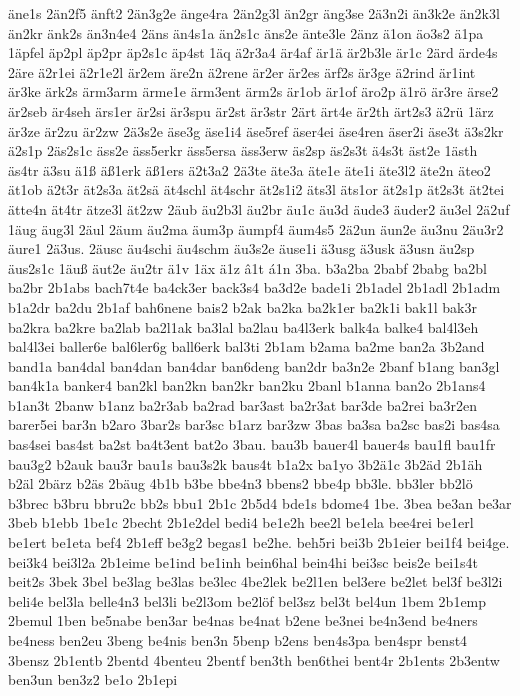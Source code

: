 {äne1s
2än2f5
änft2
2än3g2e
änge4ra
2än2g3l
än2gr
äng3se
2ä3n2i
än3k2e
än2k3l
än2kr
änk2s
än3n4e4
2äns
än4s1a
än2s1c
äns2e
änte3le
2änz
ä1on
äo3s2
ä1pa
1äpfel
äp2pl
äp2pr
äp2s1c
äp4st
1äq
ä2r3a4
är4af
är1ä
är2b3le
är1c
2ärd
ärde4s
2äre
ä2r1ei
ä2r1e2l
är2em
äre2n
ä2rene
är2er
är2es
ärf2s
är3ge
ä2rind
är1int
är3ke
ärk2s
ärm3arm
ärme1e
ärm3ent
ärm2s
är1ob
är1of
äro2p
ä1rö
är3re
ärse2
är2seb
är4seh
ärs1er
är2si
är3spu
är2st
är3str
2ärt
ärt4e
är2th
ärt2s3
ä2rü
1ärz
är3ze
är2zu
är2zw
2ä3s2e
äse3g
äse1i4
äse5ref
äser4ei
äse4ren
äser2i
äse3t
ä3s2kr
ä2s1p
2äs2s1c
äss2e
äss5erkr
äss5ersa
äss3erw
äs2sp
äs2s3t
ä4s3t
äst2e
1ästh
äs4tr
ä3su
ä1ß
äß1erk
äß1ers
ä2t3a2
2ä3te
äte3a
äte1e
äte1i
äte3l2
äte2n
äteo2
ät1ob
ä2t3r
ät2s3a
ät2sä
ät4schl
ät4schr
ät2s1i2
äts3l
äts1or
ät2s1p
ät2s3t
ät2tei
ätte4n
ät4tr
ätze3l
ät2zw
2äub
äu2b3l
äu2br
äu1c
äu3d
äude3
äuder2
äu3el
2ä2uf
1äug
äug3l
2äul
2äum
äu2ma
äum3p
äumpf4
äum4s5
2ä2un
äun2e
äu3nu
2äu3r2
äure1
2ä3us.
2äusc
äu4schi
äu4schm
äu3s2e
äuse1i
ä3usg
ä3usk
ä3usn
äu2sp
äus2s1c
1äuß
äut2e
äu2tr
ä1v
1äx
ä1z
â1t
á1n
3ba.
b3a2ba
2babf
2babg
ba2bl
ba2br
2b1abs
bach7t4e
ba4ck3er
back3s4
ba3d2e
bade1i
2b1adel
2b1adl
2b1adm
b1a2dr
ba2du
2b1af
bah6nene
bais2
b2ak
ba2ka
ba2k1er
ba2k1i
bak1l
bak3r
ba2kra
ba2kre
ba2lab
ba2l1ak
ba3lal
ba2lau
ba4l3erk
balk4a
balke4
bal4l3eh
bal4l3ei
baller6e
bal6ler6g
ball6erk
bal3ti
2b1am
b2ama
ba2me
ban2a
3b2and
band1a
ban4dal
ban4dan
ban4dar
ban6deng
ban2dr
ba3n2e
2banf
b1ang
ban3gl
ban4k1a
banker4
ban2kl
ban2kn
ban2kr
ban2ku
2banl
b1anna
ban2o
2b1ans4
b1an3t
2banw
b1anz
ba2r3ab
ba2rad
bar3ast
ba2r3at
bar3de
ba2rei
ba3r2en
barer5ei
bar3n
b2aro
3bar2s
bar3sc
b1arz
bar3zw
3bas
ba3sa
ba2sc
bas2i
bas4sa
bas4sei
bas4st
ba2st
ba4t3ent
bat2o
3bau.
bau3b
bauer4l
bauer4s
bau1fl
bau1fr
bau3g2
b2auk
bau3r
bau1s
bau3s2k
baus4t
b1a2x
ba1yo
3b2ä1c
3b2äd
2b1äh
b2äl
2bärz
b2äs
2bäug
4b1b
b3be
bbe4n3
bbens2
bbe4p
bb3le.
bb3ler
bb2lö
b3brec
b3bru
bbru2c
bb2s
bbu1
2b1c
2b5d4
bde1s
bdome4
1be.
3bea
be3an
be3ar
3beb
b1ebb
1be1c
2becht
2b1e2del
bedi4
be1e2h
bee2l
be1ela
bee4rei
be1erl
be1ert
be1eta
bef4
2b1eff
be3g2
begas1
be2he.
beh5ri
bei3b
2b1eier
bei1f4
bei4ge.
bei3k4
bei3l2a
2b1eime
be1ind
be1inh
bein6hal
bein4hi
bei3sc
beis2e
bei1s4t
beit2s
3bek
3bel
be3lag
be3las
be3lec
4be2lek
be2l1en
bel3ere
be2let
bel3f
be3l2i
beli4e
bel3la
belle4n3
bel3li
be2l3om
be2löf
bel3sz
bel3t
bel4un
1bem
2b1emp
2bemul
1ben
be5nabe
ben3ar
be4nas
be4nat
b2ene
be3nei
be4n3end
be4ners
be4ness
ben2eu
3beng
be4nis
ben3n
5benp
b2ens
ben4s3pa
ben4spr
benst4
3bensz
2b1entb
2bentd
4benteu
2bentf
ben3th
ben6thei
bent4r
2b1ents
2b3entw
ben3un
ben3z2
be1o
2b1epi
}
